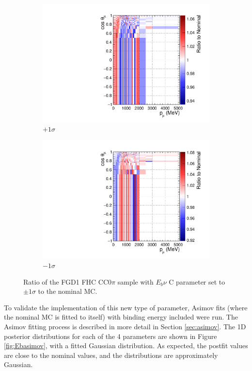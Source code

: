 \begin{figure}
\centering
\begin{subfigure}{.5\textwidth}
  \centering
  \includegraphics[width=0.95\linewidth]{figs/EbNuCP1Ratio}
  \caption{$+1\sigma$}\label{fig:EbratiosP1}
\end{subfigure}%
\begin{subfigure}{.5\textwidth}
  \centering
  \includegraphics[width=0.95\linewidth]{figs/EbNuCM1Ratio}
  \caption{$-1\sigma$}\label{fig:EbratiosM1}
\end{subfigure}
\caption{Ratio of the FGD1 FHC CC0$\pi$ sample with $E_{b}\nu$ C parameter set to $\pm 1\sigma$ to the nominal MC.}
\label{fig:Ebratios}
\end{figure}

To validate the implementation of this new type of parameter, Asimov fits (where the nominal MC is fitted to itself) with binding energy included were run. The Asimov fitting process is described in more detail in Section \ref{sec:asimov}. The 1D posterior distributions for each of the 4 parameters are shown in Figure \ref{fig:Ebasimov}, with a fitted Gaussian distribution. As expected, the postfit values are close to the nominal values, and the distributions are approximately Gaussian. 


